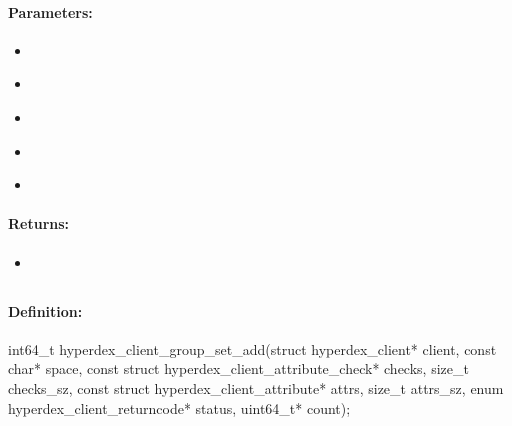 \paragraph{Parameters:}
\begin{itemize}[noitemsep]
\item {}\\

\item {}\\

\item {}\\

\item {}\\

\item {}\\

\end{itemize}

\paragraph{Returns:}
\begin{itemize}[noitemsep]
\item {}\\

\end{itemize}

\pagebreak
\subsection{}
\label{api:c:group_set_add}


\paragraph{Definition:}
\begin{ccode}
int64_t hyperdex_client_group_set_add(struct hyperdex_client* client,
        const char* space,
        const struct hyperdex_client_attribute_check* checks, size_t checks_sz,
        const struct hyperdex_client_attribute* attrs, size_t attrs_sz,
        enum hyperdex_client_returncode* status,
        uint64_t* count);
\end{ccode}

